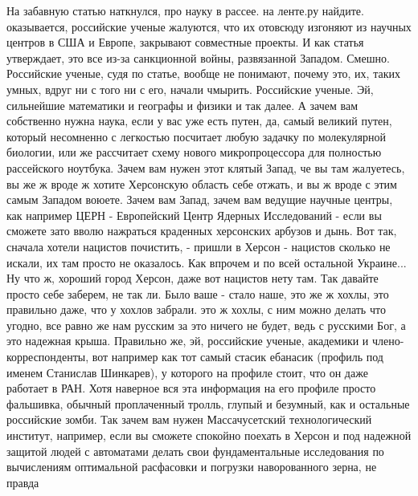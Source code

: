  
 
 
 
 

На забавную статью наткнулся, про науку в рассее. на ленте.ру найдите.
оказывается, российские ученые жалуются, что их отовсюду изгоняют из научных
центров в США и Европе, закрывают совместные проекты. И как статья утверждает,
это все из-за санкционной войны, развязанной Западом. Смешно. Российские
ученые, судя по статье, вообще не понимают, почему это, их, таких умных, вдруг
ни с того ни с его, начали чмырить. Российские ученые. Эй, сильнейшие
математики и географы и физики и так далее. А зачем вам собственно нужна наука,
если у вас уже есть путен, да, самый великий путен, который несомненно с
легкостью посчитает любую задачку по молекулярной биологии, или же рассчитает
схему нового микропроцессора для полностью рассейского ноутбука. Зачем вам
нужен этот клятый Запад, че вы там жалуетесь, вы же ж вроде ж хотите Херсонскую
область себе отжать, и вы ж вроде с этим самым Западом воюете.  Зачем вам
Запад, зачем вам ведущие научные центры, как например ЦЕРН - Европейский Центр
Ядерных Исследований - если вы сможете зато вволю нажраться краденных
херсонских арбузов и дынь. Вот так, сначала хотели нацистов почистить, - пришли
в Херсон - нацистов сколько не искали, их там просто не оказалось. Как впрочем
и по всей остальной Украине... Ну что ж, хороший город Херсон, даже вот
нацистов нету там. Так давайте просто себе заберем, не так ли. Было ваше -
стало наше, это же ж хохлы, это правильно даже, что у хохлов забрали. это ж
хохлы, с ним можно делать что угодно, все равно же нам русским за это ничего не
будет, ведь с русскими Бог, а это надежная крыша. Правильно же, эй, российские
ученые, академики и члено-корреспонденты, вот например как тот самый стасик
ебанасик (профиль под именем Станислав Шинкарев), у которого на профиле стоит,
что он даже работает в РАН. Хотя наверное вся эта информация на его профиле
просто фальшивка, обычный проплаченный тролль, глупый и безумный, как и
остальные российские зомби. Так зачем вам нужен Массачусетский технологический
институт, например, если вы сможете спокойно поехать в Херсон и под надежной
защитой людей с автоматами делать свои фундаментальные исследования по
вычислениям оптимальной расфасовки и погрузки наворованного зерна, не правда
